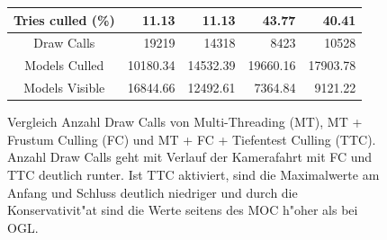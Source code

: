 \documentclass[journal]{vgtc}
\begin{document}
\begin{figure}
\begin{minipage}{\textwidth}
{\begin{tabular}{| c | r | r | r | r |}
				Tries culled (\%)    & 11.13     & 11.13     & 43.77		& 40.41 		\\ \hline
				Draw Calls           & 19219     & 14318     & 8423     & 10528 		\\ \hline
				Models Culled        & 10180.34  & 14532.39  & 19660.16 & 17903.78 	\\ \hline
				Models Visible       & 16844.66  & 12492.61  & 7364.84  & 9121.22 	\\ \hline
			\end{tabular}}
	\end{minipage}
	\caption{Vergleich Anzahl Draw Calls von Multi-Threading (MT), MT + Frustum Culling (FC) und MT + FC + Tiefentest Culling (TTC). Anzahl Draw Calls geht mit Verlauf der Kamerafahrt mit FC und TTC deutlich runter. Ist TTC aktiviert, sind die Maximalwerte am Anfang und Schluss deutlich niedriger und durch die Konservativit"at sind die Werte seitens des MOC h"oher als bei OGL.}
	\label{fig:OGL_MOC_frustum_culling}
\end{figure}

\end{document}
